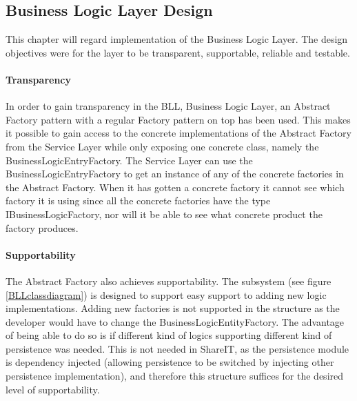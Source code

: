 \documentclass[../report.tex]{subfiles}
\begin{document}
\graphicspath{{img/}{../img/}}

\subsection{Business Logic Layer Design}

This chapter will regard implementation of the Business Logic Layer. The design objectives were for the layer to be transparent, supportable, reliable and testable.

\paragraph{Transparency}
In order to gain transparency in the BLL, Business Logic Layer, an Abstract Factory pattern with a regular Factory pattern on top has been used. This makes it possible to gain access to the concrete implementations of the Abstract Factory from the Service Layer while only exposing one concrete class, namely the BusinessLogicEntryFactory. The Service Layer can use the BusinessLogicEntryFactory to get an instance of any of the concrete factories in the Abstract Factory. When it has gotten a concrete factory it cannot see which factory it is using since all the concrete factories have the type IBusinessLogicFactory, nor will it be able to see what concrete product the factory produces.





\paragraph{Supportability}
The Abstract Factory also achieves supportability. The subsystem (see figure \ref{BLLclassdiagram}) is designed to support easy support to adding new logic implementations. Adding new factories is not supported in the structure as the developer would have to change the BusinessLogicEntityFactory. The advantage of being able to do so is if different kind of logics supporting different kind of persistence was needed. This is not needed in ShareIT, as the persistence module is dependency injected (allowing persistence to be switched by injecting other persistence implementation), and therefore this structure suffices for the desired level of supportability.
\end{document}
